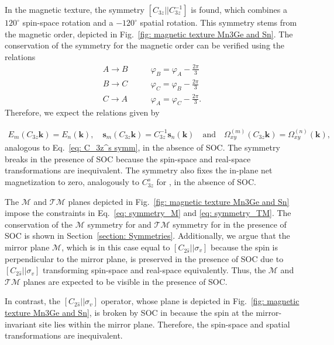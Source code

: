 In the magnetic texture, the symmetry $[C_{3z}||C_{3z}^{-1}]$ is found, which combines a $120^\circ$ spin-space rotation and a $-120^\circ$ spatial rotation. This symmetry stems from the magnetic order, depicted in Fig.~\ref{fig: magnetic texture Mn3Ge and Sn}. The conservation of the symmetry for the magnetic order can be verified using the relations
\begin{align}
    A\to B & \qquad  \varphi_B = \varphi_A -\frac{2\pi}{3} \nonumber \\
    B\to C & \qquad \varphi_C = \varphi_B -\frac{2\pi}{3} \nonumber  \\
    C\to A & \qquad \varphi_A = \varphi_C -\frac{2\pi}{3}.
\end{align}
Therefore, we expect the relations given by

\begin{align}
    E_m(C_{3z}\mathbf k)=E_n(\mathbf k), \quad
    \mathbf s_m(C_{3z}\mathbf k)
  =C_{3z}^{-1}\mathbf s_n(\mathbf k) \quad \text{and} \quad
    \Omega_{xy}^{(m)}(C_{3z}\mathbf k)
  =\Omega_{xy}^{(n)}(\mathbf k),
    \label{eq: C_3z^-1 symm}
\end{align}
analogous to Eq.~\eqref{eq: C_3z^s symm}, in the absence of SOC. The symmetry breaks in the presence of SOC because the spin-space and real-space transformations are inequivalent.
The symmetry also fixes the in-plane net magnetization to zero, analogously to $C_{3z}^s$ for , in the absence of SOC.

The $\mathcal{M}$ and $\mathcal{TM}$ planes depicted in Fig.~\ref{fig: magnetic texture Mn3Ge and Sn} impose the constraints in Eq.~\eqref{eq: symmetry_M} and \eqref{eq: symmetry_TM}.
The conservation of the $\mathcal{M}$ symmetry for  and $\mathcal{TM}$ symmetry for  in the presence of SOC is shown in Section~\ref{section: Symmetries}. 
Additionally, we argue that the mirror plane $\mathcal{M}$, which is in this case equal to $[C_{2\hat{s}}||\sigma_v]$ because the spin is perpendicular to the mirror plane, is preserved in the presence of SOC due to $[C_{2\hat{s}}||\sigma_v]$ transforming spin-space and real-space equivalently.
Thus, the $\mathcal{M}$ and $\mathcal{TM}$ planes are expected to be visible in the presence of SOC.

In contrast, the $[C_{2\hat{s}}||\sigma_v]$ operator, whose plane is depicted in Fig.~\ref{fig: magnetic texture Mn3Ge and Sn}, is broken by SOC in  because the spin at the mirror-invariant site lies within the mirror plane. Therefore, the spin-space and spatial transformations are inequivalent.   \\


